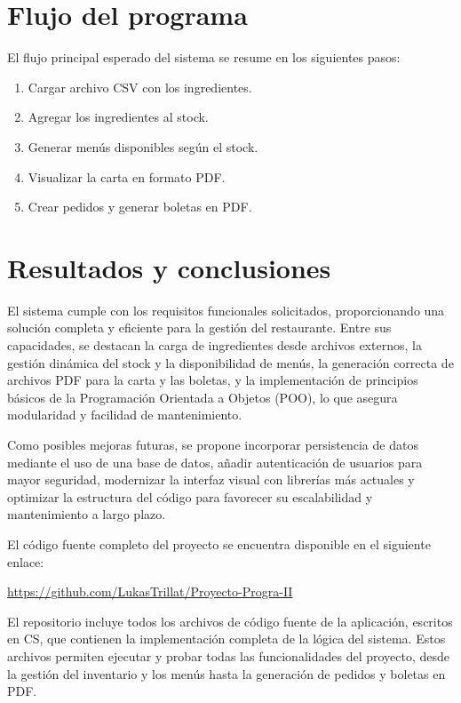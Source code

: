 \documentclass[12pt,a4paper]{article}
\begin{document}
\section{Flujo del programa}

El flujo principal esperado del sistema se resume en los siguientes pasos:

\begin{enumerate}
    \item Cargar archivo CSV con los ingredientes.
    \item Agregar los ingredientes al stock.
    \item Generar menús disponibles según el stock.
    \item Visualizar la carta en formato PDF.
    \item Crear pedidos y generar boletas en PDF.
\end{enumerate}

\newpage

\section{Resultados y conclusiones}

El sistema cumple con los requisitos funcionales solicitados, proporcionando una solución completa y eficiente para la gestión del restaurante. Entre sus capacidades, se destacan la carga de ingredientes desde archivos externos, la gestión dinámica del stock y la disponibilidad de menús, la generación correcta de archivos PDF para la carta y las boletas, y la implementación de principios básicos de la Programación Orientada a Objetos (POO), lo que asegura modularidad y facilidad de mantenimiento.

Como posibles mejoras futuras, se propone incorporar persistencia de datos mediante el uso de una base de datos, añadir autenticación de usuarios para mayor seguridad, modernizar la interfaz visual con librerías más actuales y optimizar la estructura del código para favorecer su escalabilidad y mantenimiento a largo plazo.

\bigskip
El código fuente completo del proyecto se encuentra disponible en el siguiente enlace:

\begin{center}
    \url{https://github.com/LukasTrillat/Proyecto-Progra-II}
\end{center}

El repositorio incluye todos los archivos de código fuente de la aplicación, escritos en CS, que contienen la implementación completa de la lógica del sistema. Estos archivos permiten ejecutar y probar todas las funcionalidades del proyecto, desde la gestión del inventario y los menús hasta la generación de pedidos y boletas en PDF.
\end{document}
